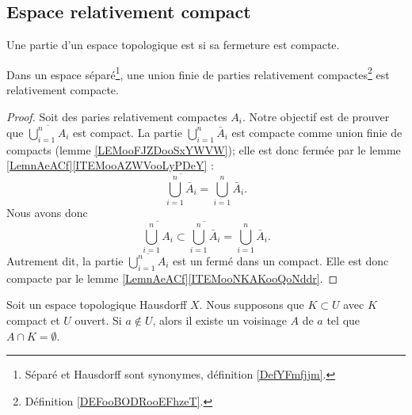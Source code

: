 \subsection{Espace relativement compact}

\begin{definition}      \label{DEFooBODRooEFhzeT}
	Une partie d'un espace topologique est  si sa fermeture  est compacte.
\end{definition}

\begin{lemma}		\label{LEMooJXGUooXDGIXG}
	Dans un espace séparé\footnote{Séparé et Hausdorff sont synonymes, définition \ref{DefYFmfjjm}.}, une union finie de parties relativement compactes\footnote{Définition \ref{DEFooBODRooEFhzeT}.} est relativement compacte.
\end{lemma}

\begin{proof}
	Soit des paries relativement compactes \( A_i\). Notre objectif est de prouver que \( \overline{\bigcup_{i=1}^nA_i}\) est compact. La partie \( \bigcup_{i=1}^n\bar A_i\) est compacte comme union finie de compacts (lemme \ref{LEMooFJZDooSxYWVW}); elle est donc fermée par le lemme \ref{LemnAeACf}\ref{ITEMooAZWVooLyPDeY} :
	\begin{equation}
		\overline{\bigcup_{i=1}^n\bar A_i}=\bigcup_{i=1}^n\bar A_i.
	\end{equation}
	Nous avons donc
	\begin{equation}
		\overline{\bigcup_{i=1}^nA_i}\subset\overline{\bigcup_{i=1}^n\bar A_i}=\bigcup_{i=1}^n\bar A_i.
	\end{equation}
	Autrement dit, la partie \( \overline{\bigcup_{i=1}^nA_i}\) est un fermé dans un compact. Elle est donc compacte par le lemme \ref{LemnAeACf}\ref{ITEMooNKAKooQoNddr}.
\end{proof}

\begin{lemma}			\label{LEMooNIJEooMdvkuA}
	Soit un espace topologique Hausdorff \( X\). Nous supposons que \( K\subset U\) avec \( K\) compact et \( U\) ouvert. Si \( a\not\in U\), alors il existe un voisinage \( A\) de \( a\) tel que \( A\cap K=\emptyset\).
\end{lemma}

